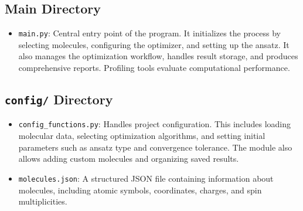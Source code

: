 \subsection{Main Directory}
\begin{itemize}
    \item \texttt{main.py}:
    Central entry point of the program. It initializes the process by selecting molecules, configuring the optimizer, and setting up the ansatz. It also manages the optimization workflow, handles result storage, and produces comprehensive reports. Profiling tools evaluate computational performance.
\end{itemize}

\subsection{\texttt{config/} Directory}
\begin{itemize}
    \item \texttt{config\_functions.py}:
    Handles project configuration. This includes loading molecular data, selecting optimization algorithms, and setting initial parameters such as ansatz type and convergence tolerance. The module also allows adding custom molecules and organizing saved results.
    \item \texttt{molecules.json}:
    A structured JSON file containing information about molecules, including atomic symbols, coordinates, charges, and spin multiplicities.
\end{itemize}

